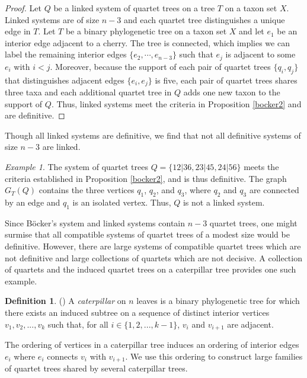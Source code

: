 \documentclass[final,3p,times]{elsarticle}
\theoremstyle{definition}
\newtheorem{defn}[thm]{Definition}
\theoremstyle{remark}
\newtheorem*{ex}{Example}
\begin{document}
\begin{proof}
Let $Q$ be a  linked system of quartet trees on a tree $T$ on a taxon set $X$. Linked systems are of size $n-3$ and each quartet tree distinguishes a unique edge in $T$. Let $T$ be a binary phylogenetic tree on a taxon set $X$ and let $e_1$ be an interior edge adjacent to a cherry. The tree is connected, which implies we can label the remaining interior edges $\{e_2, \cdots, e_{n-3} \}$ such that $e_j$ is adjacent to some $e_i$ with $i <j$. Moreover, because the support of each pair of quartet trees $\{q_i,q_j\}$ that distinguishes adjacent edges $\{e_i,e_j\}$ is five, each pair of quartet trees shares three taxa and each additional quartet tree in $Q$ adds one new taxon to the support of $Q$. Thus, linked systems meet the criteria in Proposition \ref{bocker2} and are definitive. 
\end{proof}

Though all linked systems are definitive, we find that not all definitive systems of size $n-3$ are linked.

\begin{ex}
The system of quartet trees $Q=\{12|36,23|45,24|56\}$ meets the criteria established in Proposition \ref{bocker2}, and is thus definitive. The graph $G_T(Q)$ contains the three vertices $q_1$, $q_2$, and $q_3$, where $q_2$ and $q_3$ are connected by an edge and $q_1$ is an isolated vertex. Thus, $Q$ is not a linked system. 
\end{ex}


Since B{\"o}cker's system and linked systems contain $n-3$ quartet trees, one might surmise that all compatible systems of quartet trees of a modest size would be definitive. However, there are  large systems of compatible quartet trees which are not definitive and large collections of quartets which are not decisive. A collection of quartets and the induced quartet trees on a caterpillar tree provides one such example.

\begin{defn} (\cite{semple}) A \emph{caterpillar} on $n$ leaves is a binary phylogenetic tree for which there exists an induced subtree on a sequence of distinct interior vertices $v_1,v_2,...,v_k$ such that, for all $i \in \{1,2,...,k-1\}$, $v_i$ and $v_{i+1}$ are adjacent.
\end{defn}

The ordering of vertices in a caterpillar tree induces an ordering of interior edges $e_i$ where $e_i$ connects $v_i$ with $v_{i+1}$.  We use this ordering to construct large families of quartet trees shared by several caterpillar trees.
\end{document}
